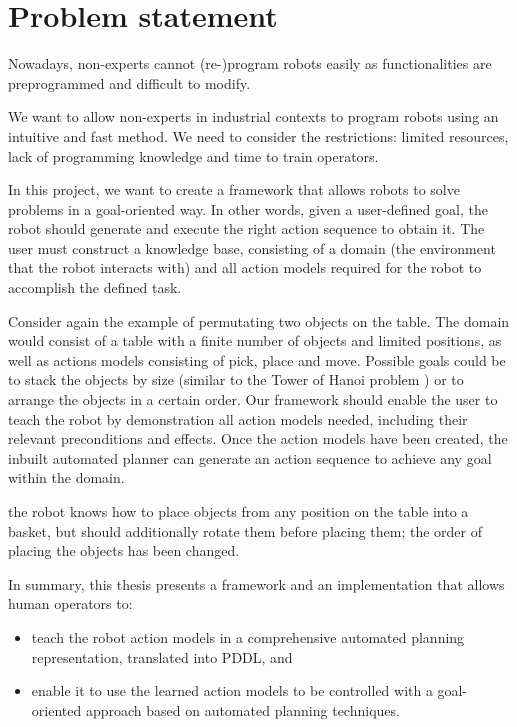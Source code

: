 \section{Problem statement}
Nowadays, non-experts cannot (re-)program robots easily as functionalities are preprogrammed and difficult to modify.

We want to allow non-experts in industrial contexts to program robots using an intuitive and fast method.
We need to consider the restrictions: limited resources, lack of programming knowledge and time to train operators.

In this project, we want to create a framework that allows robots to solve problems in a goal-oriented way.
In other words, given a user-defined goal, the robot should generate and execute the right action sequence to obtain it.
The user must construct a knowledge base, consisting of a domain (the environment that the robot interacts with) and all action models required for the robot to accomplish the defined task.

Consider again the example of permutating two objects on the table.
The domain would consist of a table with a finite number of objects and limited positions, as well as actions models consisting of pick, place and move. Possible goals could be to stack the objects by size (similar to the Tower of Hanoi problem \cite{douglas1985metamagical}) or to arrange the objects in a certain order. Our framework should enable the user to teach the robot by demonstration all action models needed, including their relevant preconditions and effects. Once the action models have been created, the inbuilt automated planner can generate an action sequence to achieve any goal within the domain. 

the robot knows how to place objects from any position on the table into a basket, but should additionally rotate them before placing them;
the order of placing the objects has been changed.

\noindent In summary, this thesis presents a framework and an implementation that allows human operators to:

\begin{itemize}
\item teach the robot action models in a comprehensive automated planning representation, translated into PDDL, and
\item enable it to use the learned action models to be controlled with a goal-oriented approach based on automated planning techniques.
\end{itemize}

